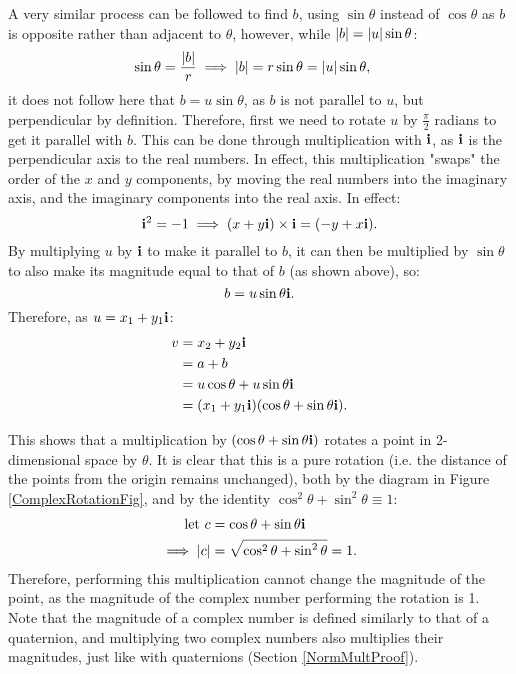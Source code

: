 \documentclass[10pt]{article}
\begin{document}
A very similar process can be followed to find $b$, using $\sin\theta$ instead of $\cos\theta$ as $b$ is opposite rather than adjacent to $\theta$, however, while $\abs{b} = \abs{u}\sin\theta$:
\begin{equation}
    \begin{aligned}
        \sin\theta = \frac{\abs{b}}{r} &\implies \abs{b} = r\sin\theta = \abs{u}\sin\theta,
    \end{aligned}
\end{equation}
it does not follow here that $b = u\sin\theta$, as $b$ is not parallel to $u$, but perpendicular by definition. Therefore, first we need to rotate $u$ by $\frac{\pi}{2}$ radians to get it parallel with $b$. This can be done through multiplication with $\vb{i}$, as $\vb{i}$ is the perpendicular axis to the real numbers. In effect, this multiplication "swaps" the order of the $x$ and $y$ components, by moving the real numbers into the imaginary axis, and the imaginary components into the real axis. In effect:
\begin{equation}
    \vb{i}^2 = -1 \implies (x + y\vb{i}) \times \vb{i} = (-y + x\vb{i}).
\end{equation}
By multiplying $u$ by $\vb{i}$ to make it parallel to $b$, it can then be multiplied by $\sin\theta$ to also make its magnitude equal to that of $b$ (as shown above), so:
\begin{equation}
    b = u\sin\theta\vb{i}.
\end{equation}
Therefore, as $u = x_1 + y_1\vb{i}$:
\begin{equation}
    \begin{aligned}
        v =\phantom{ } & x_2 + y_2\vb{i} \\
        =\phantom{ }& a + b \\
        =\phantom{ }& u\cos\theta + u\sin\theta\vb{i} \\
        =\phantom{ }& (x_1 + y_1\vb{i})(\cos\theta + \sin\theta\vb{i}).
    \end{aligned}
\end{equation}

This shows that a multiplication by $(\cos\theta + \sin\theta\vb{i})$ rotates a point in 2-dimensional space by $\theta$. It is clear that this is a pure rotation (i.e. the distance of the points from the origin remains unchanged), both by the diagram in Figure \ref{ComplexRotationFig}, and by the identity $\cos^2\theta + \sin^2\theta \equiv 1$:
\begin{equation}
    \begin{aligned}
        \text{let } c &= \cos\theta + \sin\theta\vb{i} \\
        \implies \abs{c} &= \sqrt{\cos^2\theta + \sin^2\theta} = 1.
    \end{aligned}
\end{equation}
Therefore, performing this multiplication cannot change the magnitude of the point, as the magnitude of the complex number performing the rotation is 1. Note that the magnitude of a complex number is defined similarly to that of a quaternion, and multiplying two complex numbers also multiplies their magnitudes, just like with quaternions (Section \ref{NormMultProof}).
\end{document}
